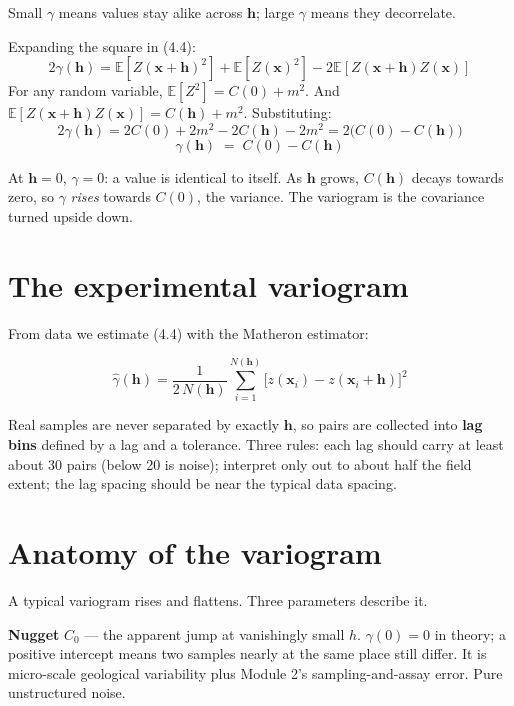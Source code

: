 \documentclass[11pt]{article}
\begin{document}
Small $\gamma$ means values stay alike across $\mathbf{h}$; large $\gamma$
means they decorrelate.

\begin{notebox}[Derivation: $\gamma(\mathbf{h}) = C(0) - C(\mathbf{h})$]
Expanding the square in (4.4):
\[ 2\gamma(\mathbf{h})=\mathbb{E}[Z(\mathbf{x}+\mathbf{h})^2]
   +\mathbb{E}[Z(\mathbf{x})^2]
   -2\mathbb{E}[Z(\mathbf{x}+\mathbf{h})Z(\mathbf{x})] \]
For any random variable, $\mathbb{E}[Z^2]=C(0)+m^2$. And
$\mathbb{E}[Z(\mathbf{x}+\mathbf{h})Z(\mathbf{x})]=C(\mathbf{h})+m^2$.
Substituting:
\[ 2\gamma(\mathbf{h}) = 2C(0)+2m^2-2C(\mathbf{h})-2m^2
   = 2\big(C(0)-C(\mathbf{h})\big) \]
\[ \boxed{\;\gamma(\mathbf{h})\;=\;C(0)-C(\mathbf{h})\;} \]
\end{notebox}

At $\mathbf{h}=0$, $\gamma=0$: a value is identical to itself. As
$\mathbf{h}$ grows, $C(\mathbf{h})$ decays towards zero, so $\gamma$
\emph{rises} towards $C(0)$, the variance. The variogram is the
covariance turned upside down.

\section{The experimental variogram}

From data we estimate (4.4) with the Matheron estimator:

\begin{eqbox}
\[ \hat{\gamma}(\mathbf{h}) = \frac{1}{2\,N(\mathbf{h})}
   \sum_{i=1}^{N(\mathbf{h})}
   \big[z(\mathbf{x}_i)-z(\mathbf{x}_i+\mathbf{h})\big]^2 \tag{4.5}\]
\end{eqbox}

Real samples are never separated by exactly $\mathbf{h}$, so pairs are
collected into \textbf{lag bins} defined by a lag and a tolerance. Three
rules: each lag should carry at least about 30 pairs (below 20 is noise);
interpret only out to about half the field extent; the lag spacing should
be near the typical data spacing.

\section{Anatomy of the variogram}

A typical variogram rises and flattens. Three parameters describe it.

\textbf{Nugget} $C_0$ --- the apparent jump at vanishingly small $h$.
$\gamma(0)=0$ in theory; a positive intercept means two samples nearly at
the same place still differ. It is micro-scale geological variability
plus Module 2's sampling-and-assay error. Pure unstructured noise.
\end{document}
